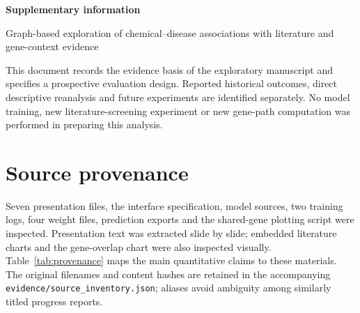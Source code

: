 
\renewcommand{\thetable}{S\arabic{table}}
\renewcommand{\thefigure}{S\arabic{figure}}
\renewcommand{\thesection}{S\arabic{section}}

\begin{center}
{\LARGE\bfseries Supplementary information}\par\vspace{8pt}
{\large Graph-based exploration of chemical--disease associations with literature and gene-context evidence}\par
\end{center}
\noindent This document records the evidence basis of the exploratory manuscript and specifies a prospective evaluation design. Reported historical outcomes, direct descriptive reanalysis and future experiments are identified separately. No model training, new literature-screening experiment or new gene-path computation was performed in preparing this analysis.

\section{Source provenance}
Seven presentation files, the interface specification, model sources, two training logs, four weight files, prediction exports and the shared-gene plotting script were inspected. Presentation text was extracted slide by slide; embedded literature charts and the gene-overlap chart were also inspected visually. Table~\ref{tab:provenance} maps the main quantitative claims to these materials. The original filenames and content hashes are retained in the accompanying \texttt{evidence/source\_inventory.json}; aliases avoid ambiguity among similarly titled progress reports.

